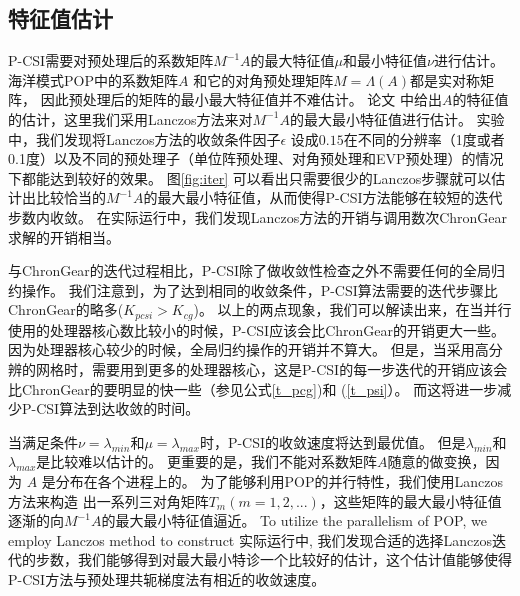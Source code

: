 \subsection{特征值估计}
\label{sec:barocsi}
P-CSI需要对预处理后的系数矩阵$M^{-1}A$的最大特征值$\mu$和最小特征值$\nu$进行估计。 
海洋模式POP中的系数矩阵$A$ 和它的对角预处理矩阵$M = \Lambda(A)$都是实对称矩阵， 因此预处理后的矩阵的最小最大特征值并不难估计。 
论文\cite{hu2013scalable} 中给出$A$的特征值的估计，这里我们采用Lanczos方法\cite{Paige1980235}来对$M^{-1}A$的最大最小特征值进行估计。
实验中，我们发现将Lanczos方法的收敛条件因子$\epsilon$ 设成$0.15$在不同的分辨率（1度或者0.1度）以及不同的预处理子（单位阵预处理、对角预处理和EVP预处理）的情况下都能达到较好的效果。 
图\ref{fig:iter} 可以看出只需要很少的Lanczos步骤就可以估计出比较恰当的$M^{-1}A$的最大最小特征值，从而使得P-CSI方法能够在较短的迭代步数内收敛。
在实际运行中，我们发现Lanczos方法的开销与调用数次ChronGear求解的开销相当。 

与ChronGear的迭代过程相比，P-CSI除了做收敛性检查之外不需要任何的全局归约操作。 
我们注意到，为了达到相同的收敛条件，P-CSI算法需要的迭代步骤比ChronGear的略多($K_{pcsi} > K_{cg}$)。 
以上的两点现象，我们可以解读出来，在当并行使用的处理器核心数比较小的时候，P-CSI应该会比ChronGear的开销更大一些。
因为处理器核心较少的时候，全局归约操作的开销并不算大。 
但是，当采用高分辨的网格时，需要用到更多的处理器核心，这是P-CSI的每一步迭代的开销应该会比ChronGear的要明显的快一些（参见公式\ref{t_pcg})和
(\ref{t_psi}）。
而这将进一步减少P-CSI算法到达收敛的时间。 

当满足条件$\nu = \lambda_{min}$和$\mu =\lambda_{max}$时，P-CSI的收敛速度将达到最优值。 
但是$\lambda_{min}$和$\lambda_{max}$是比较难以估计的。
更重要的是，我们不能对系数矩阵$A$随意的做变换，因为 $A$ 是分布在各个进程上的。
为了能够利用POP的并行特性，我们使用Lanczos方法来构造 出一系列三对角矩阵$T_m (m=1,2,...)$，这些矩阵的最大最小特征值逐渐的向$M^{-1}A$的最大最小特征值逼近。
To utilize the parallelism of POP, we employ Lanczos method  to construct
实际运行中, 我们发现合适的选择Lanczos迭代的步数，我们能够得到对最大最小特诊一个比较好的估计，这个估计值能够使得P-CSI方法与预处理共轭梯度法有相近的收敛速度。  


